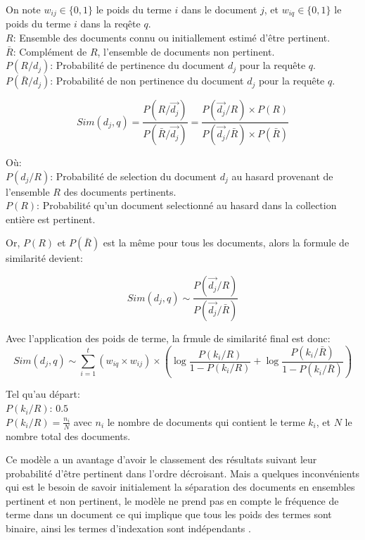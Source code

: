 \begin{definition}
    On note $w_{ij} \in \{0, 1\}$ le poids du terme $i$ dans le document $j$, et $w_{iq} \in \{0, 1\}$ le poids du terme $i$ dans la reqête $q$.\\
    $R$: Ensemble des documents connu ou initiallement estimé d'être pertinent.\\
    $\bar{R}$: Complément de $R$, l'ensemble de documents non pertinent.\\
    $P(R/d_{j})$: Probabilité de pertinence du document $d_{j}$ pour la requête $q$. \\
    $P(\bar{R}/d_{j})$: Probabilité de non pertinence du document $d_{j}$ pour la requête $q$.

    \[
        Sim(d_{j}, q) = \frac{ P(R/\vec{d_{j}}) }{ P(\bar{R}/\vec{d_{j}}) } = \frac{P(\vec{d_{j}}/R) \times P(R)}{P(\vec{d_{j}}/\bar{R}) \times P(\bar{R})}
    \]

    Où:\\
    $ P(d_{j}/R) $: Probabilité de selection du document $ d_{j} $ au hasard provenant de l'ensemble $ R $ des documents pertinents.\\
    $ P(R) $: Probabilité qu'un document selectionné au hasard dans la collection entière est pertinent.

    Or, $ P(R) $ et $ P(\bar{R}) $ est la même pour tous les documents, alors la formule de similarité devient:
    
    \[
        Sim(d_{j}, q) \sim \frac{P(\vec{d_{j}}/R)}{P(\vec{d_{j}}/\bar{R})}
    \]

    Avec l'application des poids de terme, la frmule de similarité final est donc:
    \[
        Sim(d_{j}, q) \sim \sum_{i = 1}^{t} (w_{iq} \times w_{ij}) \times \left(
            \log{\frac{P(k_{i}/R)}{1 - P(k_{i}/R)}} + \log{\frac{P(k_{i}/\bar{R})}{1 - P(k_{i}/\bar{R})}}
        \right)
    \]

    Tel qu'au départ:\\
    $ P(k_{i}/R) $: $ 0.5 $ \\
    $ P(k_{i}/R) = \frac{n_{i}}{N} $ avec $ n_{i} $ le nombre de documents qui contient le terme $ k_{i} $, et $ N $ le nombre total des documents.
\end{definition}

Ce modèle a un avantage d'avoir le classement des résultats suivant leur probabilité d'être pertinent dans l'ordre décroisant. Mais a quelques inconvénients qui est le besoin de savoir initialement la séparation des documents en ensembles pertinent et non pertinent, le modèle ne prend pas en compte le fréquence de terme dans un document ce qui implique que tous les poids des termes sont binaire, ainsi les termes d'indexation sont indépendants \citep{modern-ir}.

